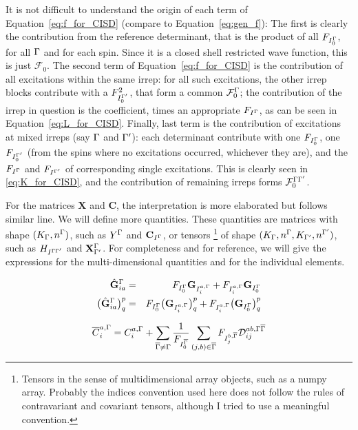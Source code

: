 It is not difficult to understand the origin of each term of Equation~\eqref{eq:f_for_CISD} (compare to Equation~\eqref{eq:gen_f}):
The first is clearly the contribution from the reference determinant, that is the product of all $F_{I_0^{\Gamma}}$, for all $\Gamma$ and for each spin.
Since it is a closed shell restricted wave function, this is just $\mathcal{F}_0$.
The second term of Equation~\eqref{eq:f_for_CISD} is the contribution of all excitations within the same irrep:
for all such excitations, the other irrep blocks contribute with a $F_{I_0^{\Gamma'}}^2$, that form a common $\mathcal{F}_0^{\Gamma}$;
the contribution of the irrep in question is the coefficient, times an appropriate $F_{I^{\Gamma}}$, as can be seen in Equation~\eqref{eq:L_for_CISD}.
Finally, last term is the contribution of excitations at mixed irreps (say $\Gamma$ and ${\Gamma'}$):
each determinant contribute with one $F_{I_0^{\Gamma}}$, one $F_{I_0^{\Gamma'}}$ (from the spins where no excitations occurred, whichever they are), and the $F_{I^{\Gamma}}$ and $F_{I^{\Gamma'}}$ of corresponding single excitations.
This is clearly seen in \eqref{eq:K_for_CISD}, and the contribution of remaining irreps forms $\mathcal{F}_0^{\Gamma{\ensuremath{\Gamma'}}}$.

For the matrices $\mathbf{X}$ and $\mathbf{C}$, the interpretation is more elaborated but follows similar line.
We will define more quantities.
These quantities are matrices with shape $(K_{\Gamma},n^{\Gamma})$, such as $Y^{\Gamma}$ and $\mathbf{C}_{I^{\Gamma}}$, or tensors
\footnote{Tensors in the sense of multidimensional array objects, such as a numpy array. Probably the indices convention used here does not follow the rules of contravariant and covariant tensors, although I tried to use a meaningful convention.}
of shape $(K_{\Gamma},n^{\Gamma},K_{\Gamma'},n^{\Gamma'})$, such as $H_{I^{\Gamma{\ensuremath{\Gamma'}}}}$ and $\mathbf{X}^{\Gamma}_{\Gamma'}$.
For completeness and for reference, we will give the expressions for the multi-dimensional quantities and for the individual elements.

\begin{eqnarray}
  \hat{{\mathbf{G}}}_{ia}^{\Gamma}
  &=& F_{I_0^{\Gamma}} {\mathbf{G}}_{I_i^{a,\Gamma}}
      + F_{I_i^{a,\Gamma}} {\mathbf{G}}_{I_0^{\Gamma}}\\
  \big( \hat{{\mathbf{G}}}_{ia}^{\Gamma} \big)^p_q
  &=& F_{I_0^{\Gamma}} \big( {\mathbf{G}}_{I_i^{a,\Gamma}}\big)^p_q
      + F_{I_i^{a,\Gamma}} \big( {\mathbf{G}}_{I_0^{\Gamma}}\big)^p_q
\end{eqnarray}

\begin{equation}
  \overline{C}_i^{a,\Gamma} = C_{i}^{a, \Gamma}
  + \sum_{{\overline{\Gamma}} \ne \Gamma} \frac{1}{F_{I_0^{{\overline{\Gamma}}}}}
  \sum_{(j,b) \in {\ensuremath{\overline{\Gamma}}}} F_{I_j^{b,{\overline{\Gamma}}}} \mathcal{D}_{ij}^{ab, \Gamma{\ensuremath{\overline{\Gamma}}}}
\end{equation}


